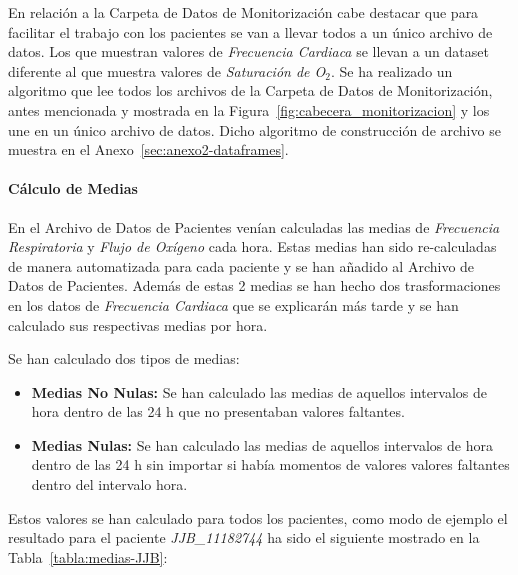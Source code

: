En relación a la Carpeta de Datos de Monitorización cabe destacar que para facilitar el trabajo con los pacientes se van a llevar todos a un único archivo de datos. Los que muestran valores de \textit{Frecuencia Cardiaca} se llevan a un dataset diferente al que muestra valores de \textit{Saturación de O$_2$}. Se ha realizado un algoritmo que lee todos los archivos de la Carpeta de Datos de Monitorización, antes mencionada y mostrada en la Figura~\ref{fig:cabecera_monitorizacion} y los une en un único archivo de datos. Dicho algoritmo de construcción de archivo se muestra en el Anexo~\ref{sec:anexo2-dataframes}.

\paragraph{Cálculo de Medias}

En el Archivo de Datos de Pacientes venían calculadas las medias de \textit{Frecuencia Respiratoria} y \textit{Flujo de Oxígeno} cada hora. Estas medias han sido re-calculadas de manera automatizada para cada paciente y se han añadido al Archivo de Datos de Pacientes. Además de estas 2 medias se han hecho dos trasformaciones en los datos de \textit{Frecuencia Cardiaca} que se explicarán más tarde y se han calculado sus respectivas medias por hora. 

Se han calculado dos tipos de medias: 

\begin{itemize}
    \item \textbf{Medias No Nulas:} Se han calculado las medias de aquellos intervalos de hora dentro de las 24 h que no presentaban valores faltantes.
    \item \textbf{Medias Nulas:} Se han calculado las medias de aquellos intervalos de hora dentro de las 24 h sin importar si había momentos de valores valores faltantes dentro del intervalo hora.
\end{itemize}

Estos valores se han calculado para todos los pacientes, como modo de ejemplo el resultado para el paciente \textit{JJB\_11182744} ha sido el siguiente mostrado en la Tabla~\ref{tabla:medias-JJB}:

\newpage
\thispagestyle{empty}

